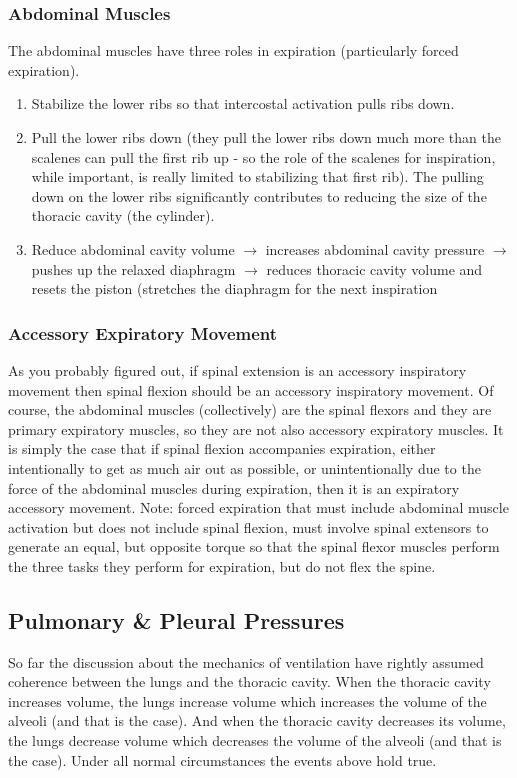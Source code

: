 \subsubsection{Abdominal Muscles}

The abdominal muscles have three roles in expiration (particularly forced expiration).

\begin{enumerate}
\item Stabilize the lower ribs so that intercostal activation pulls ribs down.
\item Pull the lower ribs down (they pull the lower ribs down much more than the scalenes can pull the first rib up - so the role of the scalenes for inspiration, while important, is really limited to stabilizing that first rib). The pulling down on the lower ribs significantly contributes to reducing the size of the thoracic cavity (the cylinder).
\item Reduce abdominal cavity volume $\rightarrow$ increases abdominal cavity pressure $\rightarrow$ pushes up the relaxed diaphragm $\rightarrow$ reduces thoracic cavity volume and resets the piston (stretches the diaphragm for the next inspiration
\end{enumerate}

\subsubsection{Accessory Expiratory Movement}

As you probably figured out, if spinal extension is an accessory inspiratory movement then spinal flexion should be an accessory inspiratory movement. Of course, the abdominal muscles (collectively) are the spinal flexors and they are primary expiratory muscles, so they are not also accessory expiratory muscles. It is simply the case that if spinal flexion accompanies expiration, either intentionally to get as much air out as possible, or unintentionally due to the force of the abdominal muscles during expiration, then it is an expiratory accessory movement. Note: forced expiration that must include abdominal muscle activation but does not include spinal flexion, must involve spinal extensors to generate an equal, but opposite torque so that the spinal flexor muscles perform the three tasks they perform for expiration, but do not flex the spine.

\subsection{Pulmonary \& Pleural Pressures}
So far the discussion about the mechanics of ventilation have rightly assumed coherence between the lungs and the thoracic cavity. When the thoracic cavity increases volume, the lungs increase volume which increases the volume of the alveoli (and that is the case). And when the thoracic cavity decreases its volume, the lungs decrease volume which decreases the volume of the alveoli (and that is the case). Under all normal circumstances the events above hold true. 

